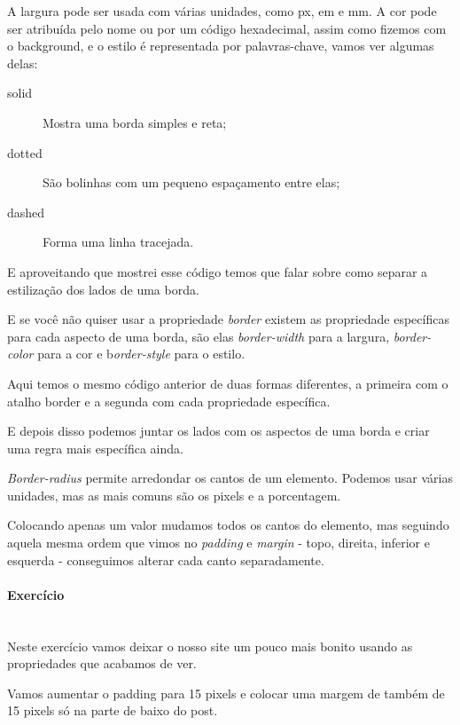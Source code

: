 \documentclass[12pt,a4paper]{article}
\begin{document}
\begin{description}
		A largura pode ser usada com várias unidades, como px, em e mm. A cor pode ser atribuída pelo nome ou por um código hexadecimal, assim como fizemos com o background, e o estilo é representada por palavras-chave, vamos ver algumas delas:
		
		\begin{description}
			\item[solid] Mostra uma borda simples e reta;
			\item[dotted] São bolinhas com um pequeno espaçamento entre elas;
			\item[dashed] Forma uma linha tracejada.
		\end{description}
		
		E aproveitando que mostrei esse código temos que falar sobre como separar a estilização dos lados de uma borda.
		
		E se você não quiser usar a propriedade \textit{border} existem as propriedade específicas para cada aspecto de uma borda, são elas \textit{border-width} para a largura, \textit{border-color} para a cor e b\textit{order-style} para o estilo.
		
		Aqui temos o mesmo código anterior de duas formas diferentes, a primeira com o atalho border e a segunda com cada propriedade específica.
		
		E depois disso podemos juntar os lados com os aspectos de uma borda e criar uma regra mais específica ainda.
		
		\textit{Border-radius} permite arredondar os cantos de um elemento. Podemos usar várias unidades, mas as mais comuns são os pixels e a porcentagem.
		
		Colocando apenas um valor mudamos todos os cantos do elemento, mas seguindo aquela mesma ordem que vimos no \textit{padding} e \textit{margin} - topo, direita, inferior e esquerda - conseguimos alterar cada canto separadamente.
	\end{description}
	
	\paragraph{Exercício} \mbox{} \\
	
	Neste exercício vamos deixar o nosso site um pouco mais bonito usando as propriedades que acabamos de ver.
	
	Vamos aumentar o padding para 15 pixels e colocar uma margem de também de 15 pixels só na parte de baixo do post.
	
\end{document}
